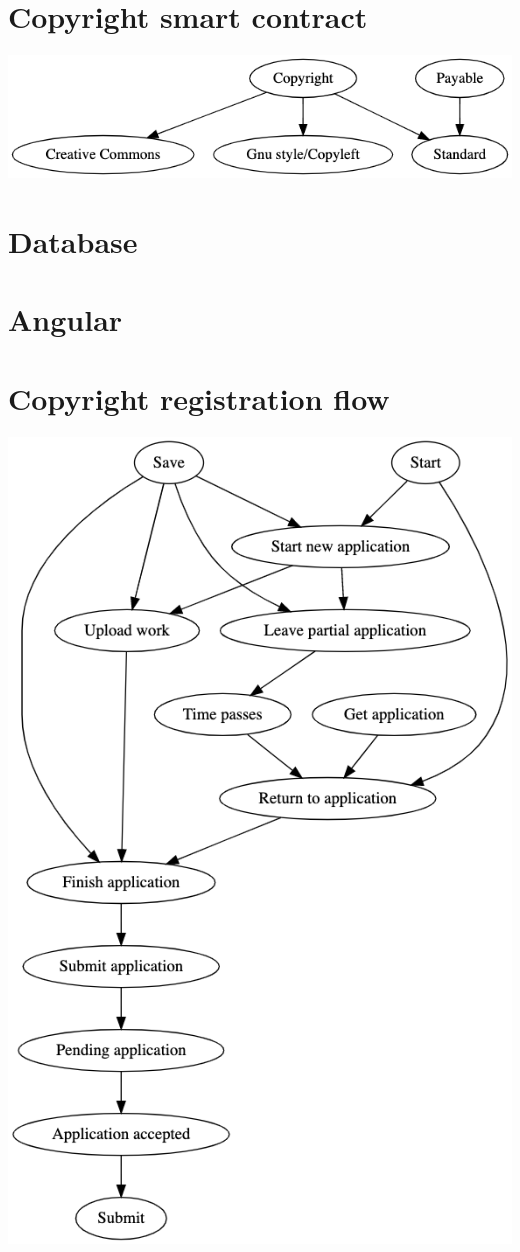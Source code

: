 \documentclass[12pt]{article}
\begin{document}
	\section{Copyright smart contract}
	
	\includegraphics[scale=0.5]{sc.png}
	
	\section{Database}
	
	\section{Angular}
	
	\section{Copyright registration flow}
	
	\includegraphics[scale=0.5]{reg.png}
	
\end{document}
